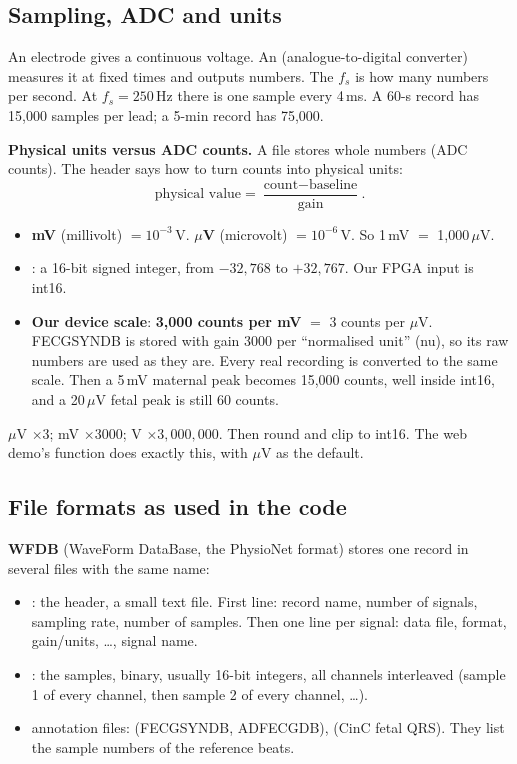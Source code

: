 \documentclass[11pt]{article}
\renewcommand{\file}[1]{\path{#1}}
\begin{document}
\subsection{Sampling, ADC and units}

\begin{simple}[Sampling]
An electrode gives a continuous voltage. An  (analogue-to-digital converter) measures it at fixed times and outputs numbers. The  $f_s$ is how many numbers per second. At $f_s = 250$\,Hz there is one sample every 4\,ms. A 60-s record has 15,000 samples per lead; a 5-min record has 75,000.
\end{simple}

\textbf{Physical units versus ADC counts.} A file stores whole numbers (ADC counts). The header says how to turn counts into physical units:
\[
  \text{physical value} = \frac{\text{count} - \text{baseline}}{\text{gain}} .
\]
\begin{itemize}
  \item \textbf{mV} (millivolt) $= 10^{-3}$\,V. \textbf{$\mu$V} (microvolt) $= 10^{-6}$\,V. So 1\,mV $=$ 1,000\,$\mu$V.
  \item {}: a 16-bit signed integer, from $-32{,}768$ to $+32{,}767$. Our FPGA input is int16.
  \item \textbf{Our device scale}: \textbf{3,000 counts per mV} $=$ 3 counts per $\mu$V. FECGSYNDB is stored with gain 3000 per ``normalised unit'' (nu), so its raw numbers are used as they are. Every real recording is converted to the same scale. Then a 5\,mV maternal peak becomes 15,000 counts, well inside int16, and a 20\,$\mu$V fetal peak is still 60 counts.
\end{itemize}

\begin{keyfact}
$\mu$V $\times 3$; \quad mV $\times 3000$; \quad V $\times 3{,}000{,}000$. Then round and clip to int16. The web demo's \file{to_counts()} function does exactly this, with $\mu$V as the default.
\end{keyfact}

\subsection{File formats as used in the code}

\textbf{WFDB} (WaveForm DataBase, the PhysioNet format) stores one record in several files with the same name:
\begin{itemize}
  \item \file{.hea}: the header, a small text file. First line: record name, number of signals, sampling rate, number of samples. Then one line per signal: data file, format, gain/units, \dots, signal name.
  \item \file{.dat}: the samples, binary, usually 16-bit integers, all channels interleaved (sample 1 of every channel, then sample 2 of every channel, \dots).
  \item annotation files: \file{.qrs} (FECGSYNDB, ADFECGDB), \file{.fqrs} (CinC fetal QRS). They list the sample numbers of the reference beats.
\end{itemize}
\end{document}
